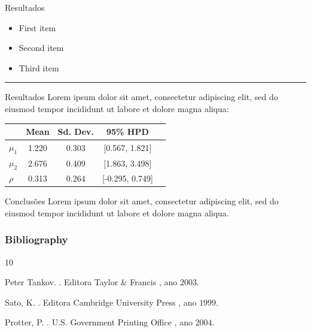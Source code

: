 \documentclass{beamer}
\begin{document}
\begin{frame}{Resultados}
\begin{minipage}{0.47\textwidth}
    \begin{itemize}
        \item First item
        \item Second item
        \item Third item
    \end{itemize}
\end{minipage}
\begin{minipage}{0.5\textwidth}
    \rule{\textwidth}{0.75\textwidth}
\end{minipage}
\end{frame} 

\begin{frame}{Resultados}
Lorem ipsum dolor sit amet, consectetur adipiscing elit, sed do eiusmod tempor incididunt ut labore et dolore magna aliqua:

\vskip 0.25cm 
\begin{table}[!h]
\centering
\begin{tabular}{l|cccc}
& Mean & Sd. Dev. & 95\% HPD \\ \hline
$\mu_1$ & 1.220 & 0.303 & [0.567, 1.821] \pause\\
$\mu_2$ & 2.676 & 0.409 & [1.863, 3.498] \pause\\
$\rho$ & 0.313 & 0.264 & [-0.295, 0.749]
\end{tabular}
\end{table}
\end{frame} 

	    
\begin{frame}{Conclusões}
Lorem ipsum dolor sit amet, consectetur adipiscing elit, sed do eiusmod tempor incididunt ut labore et dolore magna aliqua.
\end{frame}


\nocite{*}
\begin{frame}[allowframebreaks]
\frametitle{Bibliography}
\begin{thebibliography}{10}
\beamertemplatebookbibitems

 Peter Tankov.
. \newblock Editora Taylor \& Francis , ano $2003$.

 Sato, K.
. \newblock Editora Cambridge University Press , ano $1999$.

\beamertemplatearticlebibitems

 Protter, P.
. \newblock U.S. Government Printing Office , ano $2004$.

\end{thebibliography}
\end{frame}
\end{document}
